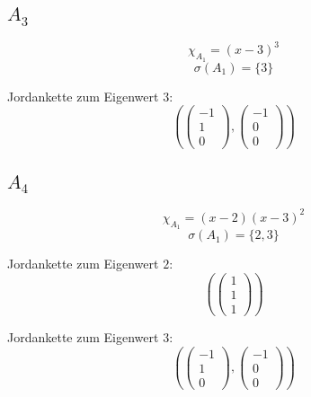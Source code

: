 \documentclass[10pt,a4paper]{article}
\begin{document}
\subsection*{$A_{3}$}

\begin{equation}
\chi_{A_{1}} = (x - 3)^{3}
\end{equation}
\begin{equation}
\sigma(A_{1}) = \{3\}
\end{equation}

Jordankette zum Eigenwert $3$:
\begin{equation}
\left(
\begin{pmatrix}
-1\\1\\0
\end{pmatrix},
\begin{pmatrix}
-1\\0\\0
\end{pmatrix}
\right)
\end{equation}

\subsection*{$A_{4}$}

\begin{equation}
\chi_{A_{1}} = (x - 2)(x - 3)^{2}
\end{equation}
\begin{equation}
\sigma(A_{1}) = \{2, 3\}
\end{equation}

Jordankette zum Eigenwert $2$:
\begin{equation}
\left(
\begin{pmatrix}
1\\1\\1
\end{pmatrix}
\right)
\end{equation}

Jordankette zum Eigenwert $3$:
\begin{equation}
\left(
\begin{pmatrix}
-1\\1\\0
\end{pmatrix},
\begin{pmatrix}
-1\\0\\0
\end{pmatrix}
\right)
\end{equation}
\end{document}
